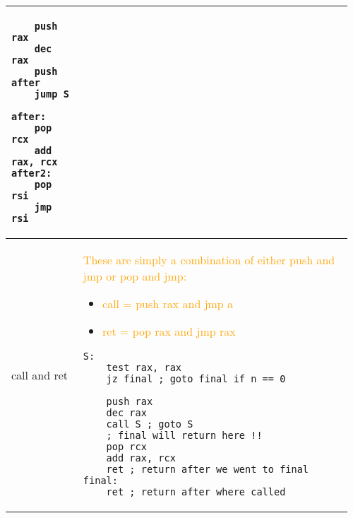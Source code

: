 \documentclass[main.tex,fontsize=8pt,paper=a4,paper=portrait,DIV=calc,]{scrartcl}
\begin{document}
\begin{table}[ht!]
\begin{tabular}{|m{0.2\linewidth}|m{0.755\linewidth}|}
\begin{lstlisting}
    push rax
    dec rax
    push after
    jump S 

after: 
    pop rcx
    add rax, rcx
after2:
    pop rsi
    jmp rsi
\end{lstlisting}\\
\hline
call and ret & 
\textcolor{orange}{These are simply a combination of either push and jmp or pop and jmp:}\newline
\begin{itemize}
\item \textcolor{orange}{call = push rax and jmp a}
\item \textcolor{orange}{ret = pop rax and jmp rax}
\vspace{-2mm}
\end{itemize} 
\begin{lstlisting}
S: 
    test rax, rax
    jz final ; goto final if n == 0

    push rax
    dec rax
    call S ; goto S
    ; final will return here !!
    pop rcx 
    add rax, rcx
    ret ; return after we went to final 
final:
    ret ; return after where called
\end{lstlisting}\\
\hline
\end{tabular}
\end{table}
\pagebreak
\end{document}
